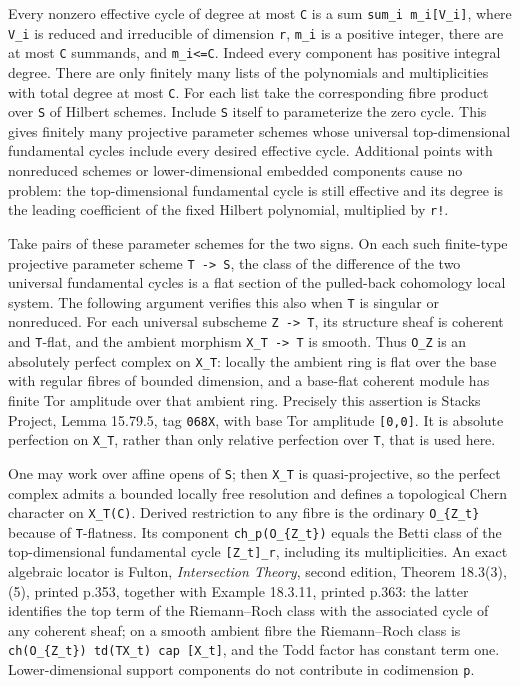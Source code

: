 \documentclass[11pt,a4paper]{article}
\theoremstyle{definition}
\begin{document}
Every nonzero effective cycle of degree at most \texttt{C} is a sum
\texttt{sum\_i\ m\_i{[}V\_i{]}}, where \texttt{V\_i} is reduced and
irreducible of dimension \texttt{r}, \texttt{m\_i} is a positive
integer, there are at most \texttt{C} summands, and
\texttt{m\_i\textless{}=C}. Indeed every component has positive integral
degree. There are only finitely many lists of the polynomials and
multiplicities with total degree at most \texttt{C}. For each list take
the corresponding fibre product over \texttt{S} of Hilbert schemes.
Include \texttt{S} itself to parameterize the zero cycle. This gives
finitely many projective parameter schemes whose universal
top-dimensional fundamental cycles include every desired effective
cycle. Additional points with nonreduced schemes or lower-dimensional
embedded components cause no problem: the top-dimensional fundamental
cycle is still effective and its degree is the leading coefficient of
the fixed Hilbert polynomial, multiplied by \texttt{r!}.

Take pairs of these parameter schemes for the two signs. On each such
finite-type projective parameter scheme \texttt{T\ -\textgreater{}\ S},
the class of the difference of the two universal fundamental cycles is a
flat section of the pulled-back cohomology local system. The following
argument verifies this also when \texttt{T} is singular or nonreduced.
For each universal subscheme \texttt{Z\ -\textgreater{}\ T}, its
structure sheaf is coherent and \texttt{T}-flat, and the ambient
morphism \texttt{X\_T\ -\textgreater{}\ T} is smooth. Thus \texttt{O\_Z}
is an absolutely perfect complex on \texttt{X\_T}: locally the ambient
ring is flat over the base with regular fibres of bounded dimension, and
a base-flat coherent module has finite Tor amplitude over that ambient
ring. Precisely this assertion is Stacks Project, Lemma 15.79.5, tag
\texttt{068X}, with base Tor amplitude \texttt{{[}0,0{]}}. It is
absolute perfection on \texttt{X\_T}, rather than only relative
perfection over \texttt{T}, that is used here.

One may work over affine opens of \texttt{S}; then \texttt{X\_T} is
quasi-projective, so the perfect complex admits a bounded locally free
resolution and defines a topological Chern character on
\texttt{X\_T(C)}. Derived restriction to any fibre is the ordinary
\texttt{O\_\{Z\_t\}} because of \texttt{T}-flatness. Its component
\texttt{ch\_p(O\_\{Z\_t\})} equals the Betti class of the
top-dimensional fundamental cycle \texttt{{[}Z\_t{]}\_r}, including its
multiplicities. An exact algebraic locator is Fulton, \emph{Intersection
Theory}, second edition, Theorem 18.3(3),(5), printed p.353, together
with Example 18.3.11, printed p.363: the latter identifies the top term
of the Riemann--Roch class with the associated cycle of any coherent
sheaf; on a smooth ambient fibre the Riemann--Roch class is
\texttt{ch(O\_\{Z\_t\})\ td(TX\_t)\ cap\ {[}X\_t{]}}, and the Todd
factor has constant term one. Lower-dimensional support components do
not contribute in codimension \texttt{p}.
\end{document}
